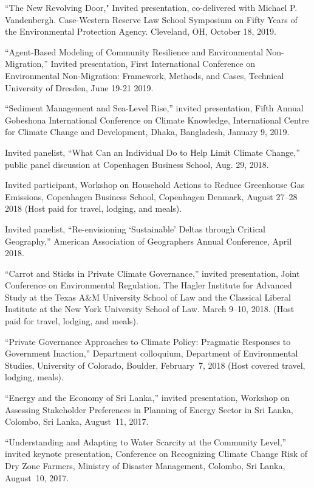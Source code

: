 %
%
\item ``The New Revolving Door," Invited presentation, co-delivered with Michael P. Vandenbergh. Case-Western Reserve Law School Symposium on Fifty Years of the Environmental Protection Agency. Cleveland, OH, October 18, 2019.
\item ``Agent-Based Modeling of Community Resilience and Environmental Non-Migration,'' Invited presentation, First International Conference on Environmental Non-Migration: Framework, Methods, and Cases, Technical University of Dresden, June 19-21 2019.
\item ``Sediment Management and Sea-Level Rise,'' invited presentation, Fifth Annual Gobeshona International Conference on Climate Knowledge, International Centre for Climate Change and Development, Dhaka, Bangladesh, January 9, 2019.
\item Invited panelist, ``What Can an Individual Do to Help Limit Climate Change,'' public panel discussion at Copenhagen Business School, Aug. 29, 2018.
\item Invited participant, Workshop on Household Actions to Reduce Greenhouse Gas Emissions, Copenhagen Business School, Copenhagen Denmark, August 27--28 2018 (Host paid for travel, lodging, and meals).
\item Invited panelist, ``Re-envisioning `Sustainable' Deltas through Critical Geography,'' American Association of Geographers Annual Conference, April 2018.
\item ``Carrot and Sticks in Private Climate Governance,'' invited presentation, Joint Conference on Environmental Regulation. The Hagler Institute for Advanced Study at the Texas A\&M University School of Law and the Classical Liberal Institute at the New York University School of Law. March 9--10, 2018. (Host paid for travel, lodging, and meals).
\item ``Private Governance Approaches to Climate Policy: Pragmatic Responses to Government Inaction,'' Department colloquium, Department of Environmental Studies, University of Colorado, Boulder, February~7, 2018 (Host covered travel, lodging, meals).
\item ``Energy and the Economy of Sri Lanka,'' invited presentation, Workshop on Assessing Stakeholder Preferences in Planning of Energy Sector in Sri Lanka, Colombo, Sri Lanka, August~11, 2017.
\item ``Understanding and Adapting to Water Scarcity at the Community Level,'' invited keynote presentation, Conference on Recognizing Climate Change Risk of Dry Zone Farmers, Ministry of Disaster Management, Colombo, Sri Lanka, August~10, 2017.
